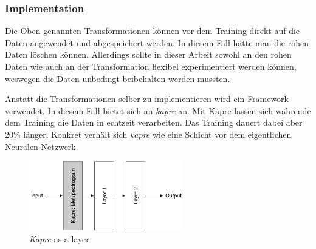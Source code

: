 \subsubsection{Implementation}

Die Oben genannten Transformationen können vor dem Training direkt auf die Daten angewendet und abgespeichert werden. In diesem Fall hätte man die rohen Daten löschen können. Allerdings sollte in dieser Arbeit sowohl an den rohen Daten wie auch an der Transformation flexibel experimentiert werden können, weswegen die Daten unbedingt beibehalten werden mussten. 

Anstatt die Transformationen selber zu implementieren wird ein Framework verwendet. In diesem Fall bietet sich an \textit{kapre}\parencite{kapre} an. Mit Kapre lassen sich währende dem Training die Daten in echtzeit verarbeiten. Das Training dauert dabei aber 20\% länger. Konkret verhält sich \textit{kapre} wie eine Schicht vor dem eigentlichen Neuralen Netzwerk.
\begin{figure}[hbt]
	\centering
		\includegraphics[width=0.6\textwidth]{assets/kapre.png}
	\centering
	\caption{\textit{Kapre}\parencite{kapre} as a layer}
	\label{img:kapre}
\end{figure}

